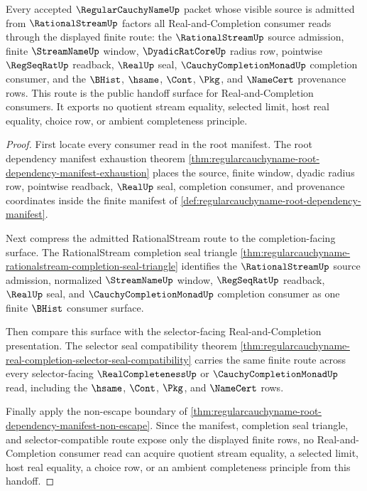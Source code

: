 \begin{theorem}
\label{thm:regularcauchyname-real-completion-handoff-spine}
Every accepted $\RegularCauchyNameUp$ packet whose visible source is admitted from $\RationalStreamUp$ factors all Real-and-Completion consumer reads through the displayed finite route: the $\RationalStreamUp$ source admission, finite $\StreamNameUp$ window, $\DyadicRatCoreUp$ radius row, pointwise $\RegSeqRatUp$ readback, $\RealUp$ seal, $\CauchyCompletionMonadUp$ completion consumer, and the $\BHist$, $\hsame$, $\Cont$, $\Pkg$, and $\NameCert$ provenance rows. This route is the public handoff surface for Real-and-Completion consumers. It exports no quotient stream equality, selected limit, host real equality, choice row, or ambient completeness principle.
\end{theorem}
\begin{proof}
First locate every consumer read in the root manifest. The root dependency manifest exhaustion theorem \autoref{thm:regularcauchyname-root-dependency-manifest-exhaustion} places the source, finite window, dyadic radius row, pointwise readback, $\RealUp$ seal, completion consumer, and provenance coordinates inside the finite manifest of \autoref{def:regularcauchyname-root-dependency-manifest}.

Next compress the admitted RationalStream route to the completion-facing surface. The RationalStream completion seal triangle \autoref{thm:regularcauchyname-rationalstream-completion-seal-triangle} identifies the $\RationalStreamUp$ source admission, normalized $\StreamNameUp$ window, $\RegSeqRatUp$ readback, $\RealUp$ seal, and $\CauchyCompletionMonadUp$ completion consumer as one finite $\BHist$ consumer surface.

Then compare this surface with the selector-facing Real-and-Completion presentation. The selector seal compatibility theorem \autoref{thm:regularcauchyname-real-completion-selector-seal-compatibility} carries the same finite route across every selector-facing $\RealCompletenessUp$ or $\CauchyCompletionMonadUp$ read, including the $\hsame$, $\Cont$, $\Pkg$, and $\NameCert$ rows.

Finally apply the non-escape boundary of \autoref{thm:regularcauchyname-root-dependency-manifest-non-escape}. Since the manifest, completion seal triangle, and selector-compatible route expose only the displayed finite rows, no Real-and-Completion consumer read can acquire quotient stream equality, a selected limit, host real equality, a choice row, or an ambient completeness principle from this handoff.
\end{proof}

